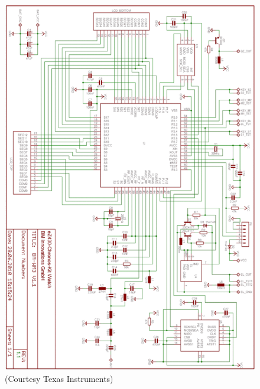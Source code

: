\begin{figure}[h]
  \centering
  \includegraphics[width=1.0\textwidth]{img/watch_schematics.png}
  \caption{(Courtesy Texas Instruments)}
\end{figure}


